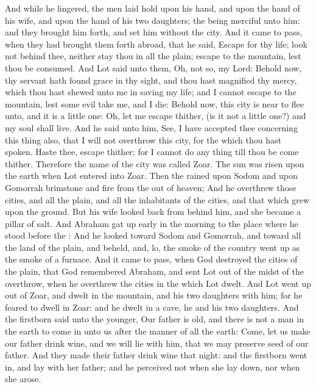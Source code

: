 \begin{biblechapter}
\verse And while he lingered, the men laid hold upon his hand, and upon the hand of his wife, and upon the hand of his two daughters; the \LORD being merciful unto him: and they brought him forth, and set him without the city.
\verse And it came to pass, when they had brought them forth abroad, that he said, Escape for thy life; look not behind thee, neither stay thou in all the plain; escape to the mountain, lest thou be consumed.
\verse And Lot said unto them, Oh, not so, my Lord:
\verse Behold now, thy servant hath found grace in thy sight, and thou hast magnified thy mercy, which thou hast shewed unto me in saving my life; and I cannot escape to the mountain, lest some evil take me, and I die:
\verse Behold now, this city is near to flee unto, and it is a little one: Oh, let me escape thither, (is it not a little one?) and my soul shall live.
\verse And he said unto him, See, I have accepted thee concerning this thing also, that I will not overthrow this city, for the which thou hast spoken.
\verse Haste thee, escape thither; for I cannot do any thing till thou be come thither. Therefore the name of the city was called Zoar.
\verse The sun was risen upon the earth when Lot entered into Zoar.
\verse Then the \LORD rained upon Sodom and upon Gomorrah brimstone and fire from the \LORD out of heaven;
\verse And he overthrew those cities, and all the plain, and all the inhabitants of the cities, and that which grew upon the ground.
\verse But his wife looked back from behind him, and she became a pillar of salt.
\verse And Abraham gat up early in the morning to the place where he stood before the \LORD:
\verse And he looked toward Sodom and Gomorrah, and toward all the land of the plain, and beheld, and, lo, the smoke of the country went up as the smoke of a furnace.
\verse And it came to pass, when God destroyed the cities of the plain, that God remembered Abraham, and sent Lot out of the midst of the overthrow, when he overthrew the cities in the which Lot dwelt.
 And Lot went up out of Zoar, and dwelt in the mountain, and his two daughters with him; for he feared to dwell in Zoar: and he dwelt in a cave, he and his two daughters.
\verse And the firstborn said unto the younger, Our father is old, and there is not a man in the earth to come in unto us after the manner of all the earth:
\verse Come, let us make our father drink wine, and we will lie with him, that we may preserve seed of our father.
\verse And they made their father drink wine that night: and the firstborn went in, and lay with her father; and he perceived not when she lay down, nor when she arose.

\end{biblechapter}
